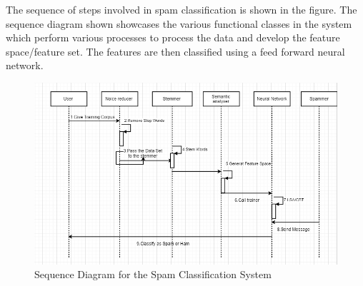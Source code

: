The sequence of steps involved in spam classification is shown in the figure. The sequence diagram shown showcases the various functional classes in the system which perform various processes to process the data and develop the feature space/feature set. The features are then classified using a feed forward neural network.
\\
\begin{figure}[ht]
\centering\includegraphics[width=0.82\linewidth]{sd.PNG}\caption{Sequence Diagram for the Spam Classification System}
\end{figure}


